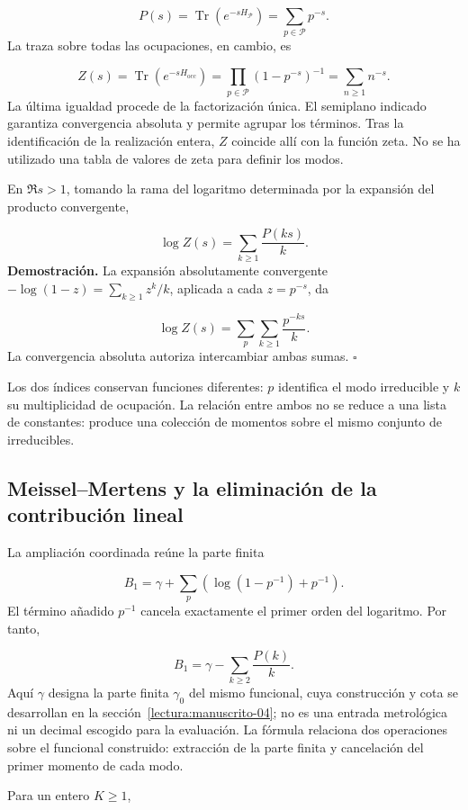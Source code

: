 \[
P(s)=\operatorname{Tr}(e^{-sH_{\mathcal P}})=\sum_{p\in\mathcal P}p^{-s}.
\]
La traza sobre todas las ocupaciones, en cambio, es

\[
Z(s)=\operatorname{Tr}(e^{-sH_{\mathrm{occ}}})
=\prod_{p\in\mathcal P}(1-p^{-s})^{-1}
=\sum_{n\ge1}n^{-s}.
\]
La última igualdad procede de la factorización única. El semiplano indicado garantiza convergencia absoluta y permite agrupar los términos. Tras la identificación de la realización entera, $Z$ coincide allí con la función zeta. No se ha utilizado una tabla de valores de zeta para definir los modos.

En $\Re s>1$, tomando la rama del logaritmo determinada por la expansión del producto convergente,

\[
\log Z(s)=\sum_{k\ge1}\frac{P(ks)}{k}.
\]
\textbf{Demostración.} La expansión absolutamente convergente $-\log(1-z)=\sum_{k\ge1}z^k/k$, aplicada a cada $z=p^{-s}$, da

\[
\log Z(s)=\sum_p\sum_{k\ge1}\frac{p^{-ks}}k.
\]
La convergencia absoluta autoriza intercambiar ambas sumas. \hfill\(\square\)

Los dos índices conservan funciones diferentes: $p$ identifica el modo irreducible y $k$ su multiplicidad de ocupación. La relación entre ambos no se reduce a una lista de constantes: produce una colección de momentos sobre el mismo conjunto de irreducibles.

\subsection{Meissel–Mertens y la eliminación de la contribución lineal}
La ampliación coordinada reúne la parte finita

\[
B_1=\gamma+\sum_p\left(\log(1-p^{-1})+p^{-1}\right).
\]
El término añadido $p^{-1}$ cancela exactamente el primer orden del logaritmo. Por tanto,

\[
B_1=\gamma-\sum_{k\ge2}\frac{P(k)}k.
\]
Aquí $\gamma$ designa la parte finita $\gamma_0$ del mismo funcional, cuya construcción y cota se desarrollan en la sección~\ref{lectura:manuscrito-04}; no es una entrada metrológica ni un decimal escogido para la evaluación. La fórmula relaciona dos operaciones sobre el funcional construido: extracción de la parte finita y cancelación del primer momento de cada modo.

Para un entero $K\ge1$,

